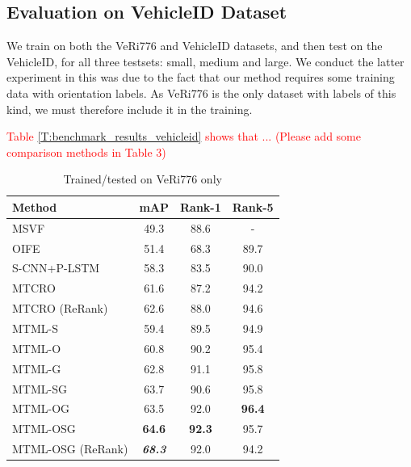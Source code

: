 \documentclass[10pt,twocolumn,letterpaper]{article}
\begin{document}
\subsection{Evaluation on VehicleID Dataset}
We train on both the VeRi776 and VehicleID datasets, and then test on the VehicleID, for all three testsets: small, medium and large. We conduct the latter experiment in this was due to the fact that our method requires some training data with orientation labels. As VeRi776 is the only dataset with labels of this kind, we must therefore include it in the training.

\textcolor{red}
{
Table \ref{T:benchmark_results_vehicleid} shows that ...
(Please add some comparison methods in Table 3)
}

\begin{table}
  \centering
  \begin{tabular}{l || c | c | c }
    \hline
    Method & mAP & Rank-1 & Rank-5 \\
    \hline
    MSVF \cite{kanaci2018vehicle} & 49.3 & 88.6 & - \\
    OIFE \cite{wang2017orientation} & 51.4 & 68.3 & 89.7 \\
    S-CNN+P-LSTM \cite{Shen_2017_ICCV} & 58.3 & 83.5 & 90.0 \\
    MTCRO \cite{xu2018framework} & 61.6 & 87.2 & 94.2 \\
    MTCRO (ReRank) \cite{xu2018framework} & 62.6 & 88.0 & 94.6 \\
    \hline
    MTML-S & 59.4 & 89.5 & 94.9 \\
    MTML-O & 60.8 & 90.2 & 95.4 \\
    MTML-G & 62.8 & 91.1 & 95.8 \\
    \hline
    MTML-SG & 63.7 & 90.6 & 95.8 \\
    MTML-OG & 63.5 & 92.0 & \bf{96.4}\\
    MTML-OSG & \bf{64.6} & \bf{92.3} & 95.7 \\
    MTML-OSG (ReRank) & \bf{\emph{68.3}} & 92.0 & 94.2 \\
    \hline
  \end{tabular}
  \caption{Trained/tested on VeRi776 only}
  \label{T:benchmark_results_veri}
\end{table}
\end{document}
